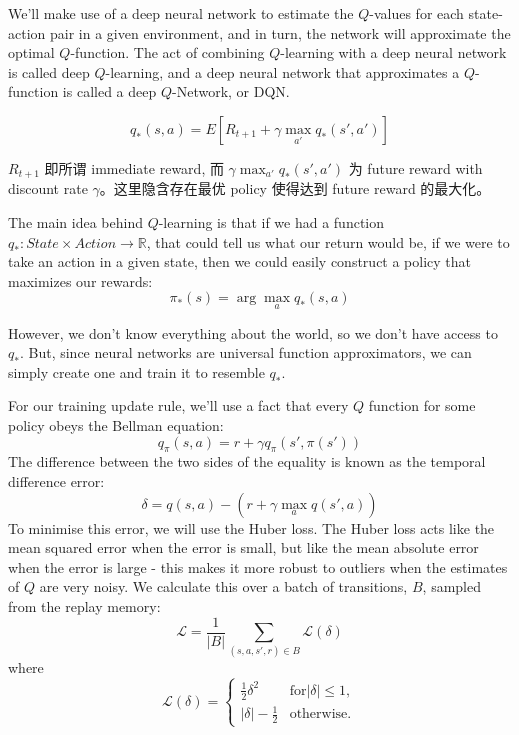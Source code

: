 We'll make use of a deep neural network to estimate the $Q$-values for each state-action 
pair in a given environment, and in turn, the network will approximate the optimal 
$Q$-function. The act of combining $Q$-learning with a deep neural network is called 
deep $Q$-learning, and a deep neural network that approximates a $Q$-function is called 
a deep $Q$-Network, or DQN.

\begin{equation}\label{eq:dqn_bellman_equation}
q_*(s,a) = E \left[ R_{t+1} + \gamma\max_{a'}q_*(s', a')
\right]
\end{equation}

\begin{emp_box}
$R_{t+1}$ 即所谓 immediate reward, 而 $\gamma\max_{a'}q_*(s', a')$ 为 future reward with 
discount rate $\gamma$。这里隐含存在最优 policy 使得达到 future reward 的最大化。

The main idea behind $Q$-learning is that if we had a function 
$q_*: State \times Action \rightarrow \mathbb{R}$, that could tell us what our return 
would be, if we were to take an action in a given state, then we could easily construct 
a policy that maximizes our rewards:
$$
\pi_*(s) = \arg\max_a q_*(s,a)
$$
\end{emp_box}

However, we don't know everything about the world, so we don't have access to $q_*$. 
But, since neural networks are universal function approximators, we can simply create 
one and train it to resemble $q_*$.

For our training update rule, we'll use a fact that every $Q$ function for some policy 
obeys the Bellman equation:
$$
q_\pi(s,a) = r + \gamma q_\pi(s', \pi(s'))
$$
\noindent{}The difference between the two sides of the equality is known as the temporal 
difference error:
$$
\delta = q(s,a) - (r + \gamma \max_a q(s', a))
$$
\noindent{}To minimise this error, we will use the Huber loss. The Huber loss acts like 
the mean squared error when the error is small, but like the mean absolute error when 
the error is large - this makes it more robust to outliers when the estimates of $Q$ 
are very noisy. We calculate this over a batch of transitions, $B$, sampled from the 
replay memory:
$$
\mathcal{L} = \frac{1}{|B|} \sum_{(s,a,s',r)\in B} \mathcal{L}(\delta)
$$
\noindent{}where
$$
\mathcal{L}(\delta) = \begin{cases}
\frac{1}{2}\delta^2 &\text{for} |\delta| \leq 1, \\
|\delta| - \frac{1}{2} &\text{otherwise.}
\end{cases}
$$

